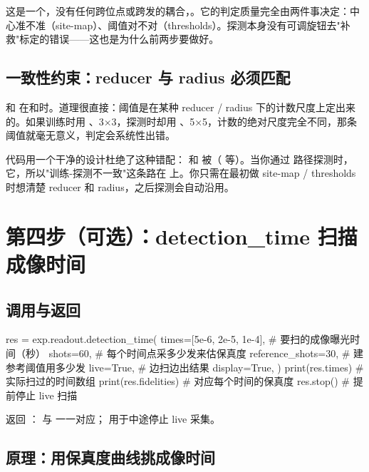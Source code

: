 \documentclass[11pt,oneside,openany]{book}
\begin{document}
这是一个，没有任何跨位点或跨发的耦合，。它的判定质量完全由两件事决定：中心准不准（site-map）、阈值对不对（thresholds）。探测本身没有可调旋钮去"补救"标定的错误——这也是为什么前两步要做好。

\subsection{一致性约束：reducer 与 radius 必须匹配}

 和  在和时。道理很直接：阈值是在某种 reducer / radius 下的计数尺度上定出来的。如果训练时用 、3×3，探测时却用 、5×5，计数的绝对尺度完全不同，那条阈值就毫无意义，判定会系统性出错。

代码用一个干净的设计杜绝了这种错配： 和  被（ 等）。当你通过  路径探测时，它，所以"训练-探测不一致"这条路在  上。你只需在最初做 site-map / thresholds 时想清楚 reducer 和 radius，之后探测会自动沿用。

\section{第四步（可选）：detection\_time 扫描成像时间}

\subsection{调用与返回}

\begin{codeblock}[Python]
res = exp.readout.detection_time(
    times=[5e-6, 2e-5, 1e-4],  # 要扫的成像曝光时间（秒）
    shots=60,                  # 每个时间点采多少发来估保真度
    reference_shots=30,        # 建参考阈值用多少发
    live=True,                 # 边扫边出结果
    display=True,
)
print(res.times)        # 实际扫过的时间数组
print(res.fidelities)   # 对应每个时间的保真度
res.stop()              # 提前停止 live 扫描
\end{codeblock}

返回 ： 与  一一对应； 用于中途停止 live 采集。

\subsection{原理：用保真度曲线挑成像时间}
\end{document}
